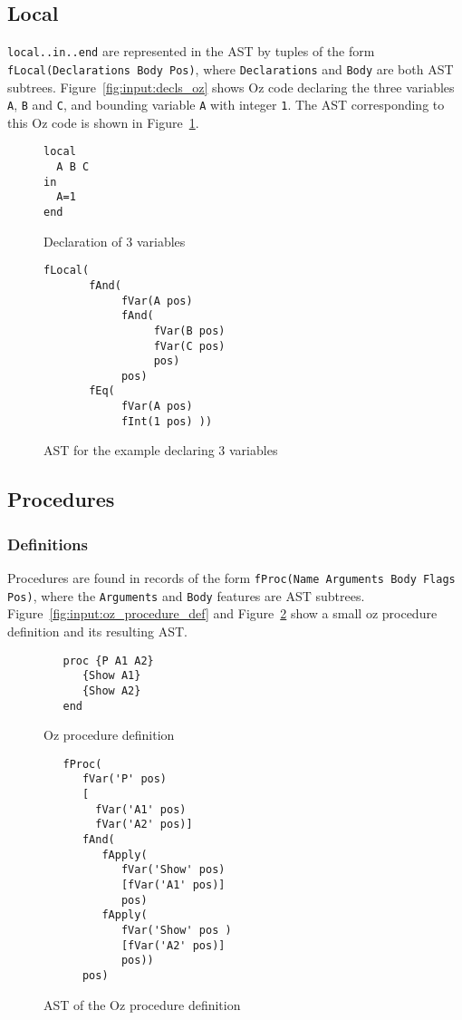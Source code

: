\documentclass[a4paper]{memoir}
\begin{document}
\subsection{Local}\label{sec:input:flocal}
\lstinline!local..in..end! are represented in the AST by tuples of the form
\lstinline!fLocal(Declarations Body Pos)!, where \lstinline!Declarations! and
\lstinline!Body! are both AST subtrees. 
Figure~\ref{fig:input:decls_oz} shows Oz code declaring the three variables
\lstinline!A!, \lstinline!B!
and \lstinline!C!, and bounding variable \lstinline!A! with integer
\lstinline!1!. The AST corresponding to this Oz code is shown in
Figure~\ref{fig:input:decls}.

\begin{figure}
\begin{lstlisting}
local
  A B C
in
  A=1
end
\end{lstlisting}
\caption{Declaration of 3 variables}
\label{fig:input:decls_oz}
\begin{lstlisting}
fLocal(
       fAnd(
            fVar(A pos) 
            fAnd(
                 fVar(B pos) 
                 fVar(C pos) 
                 pos) 
            pos) 
       fEq( 
            fVar(A pos) 
            fInt(1 pos) ))
\end{lstlisting}
\caption{AST for the example declaring 3 variables}
\label{fig:input:decls}
\end{figure}


\subsection{Procedures}\label{sec:input:procedures}
\subsubsection{Definitions}
Procedures are found in records of the form \lstinline!fProc(Name Arguments Body Flags Pos)!, 
where the \lstinline!Arguments! and \lstinline!Body! features are AST subtrees. 
Figure~\ref{fig:input:oz_procedure_def} and Figure~\ref{fig:input:ast_procedure_def} show a small oz procedure definition and its resulting AST.
\begin{figure}[ht]
\begin{lstlisting}
   proc {P A1 A2}
      {Show A1}
      {Show A2}
   end
\end{lstlisting}
\caption{Oz procedure definition}
\label{fig:input:oz_procedure_def}

\begin{lstlisting}
   fProc(
      fVar('P' pos)
      [
        fVar('A1' pos)
        fVar('A2' pos)]
      fAnd(
         fApply(
            fVar('Show' pos)
            [fVar('A1' pos)]
            pos)
         fApply(
            fVar('Show' pos )
            [fVar('A2' pos)]
            pos))
      pos)
\end{lstlisting}
\caption{AST of the Oz procedure definition}
\label{fig:input:ast_procedure_def}
\end{figure}
\end{document}
